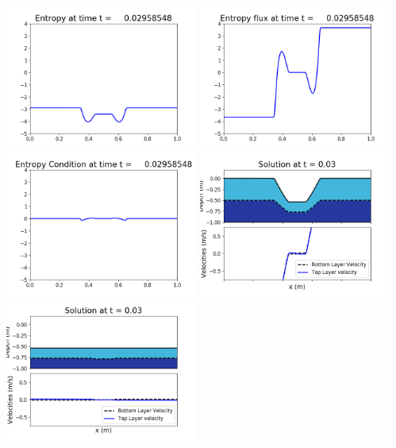 \documentclass[11pt]{article}
\begin{document}
\vskip 10pt 
\includegraphics[width=0.475\textwidth]{frame0085fig1007.png}
\includegraphics[width=0.475\textwidth]{frame0085fig1008.png}
\vskip 10pt 
\includegraphics[width=0.475\textwidth]{frame0085fig1009.png}
\vskip 10pt 
\includegraphics[width=0.475\textwidth]{frame0086fig1001.png}
\includegraphics[width=0.475\textwidth]{frame0086fig1002.png}
\end{document}

